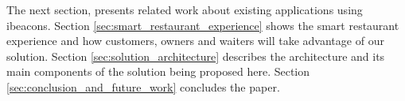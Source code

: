 The next section, presents related work about existing applications using ibeacons.
Section \ref{sec:smart_restaurant_experience} shows the smart restaurant
experience and how customers, owners and waiters will take advantage of our
solution. Section \ref{sec:solution_architecture} describes the architecture
and its main components
of the solution being proposed here.
Section \ref{sec:conclusion_and_future_work} concludes the paper.
